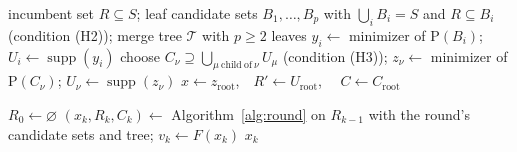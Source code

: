 \documentclass[pdflatex,sn-mathphys-num]{sn-jnl}
\theoremstyle{thmstyleone}
\theoremstyle{thmstyletwo}
\newcommand{\supp}{\operatorname{supp}}
\newcommand{\prob}[1]{\mathrm{P}(#1)}
\begin{document}
\begin{algorithm}[!ht]
\caption{One round of divide-and-conquer NNLS}\label{alg:round}
\begin{algorithmic}[1]
\Require incumbent set $R\subseteq S$; leaf candidate sets
$B_1,\dots,B_p$ with $\bigcup_i B_i=S$ and $R\subseteq B_i$
(condition (H2)); merge tree $\mathcal T$ with $p\ge2$ leaves
  \State $y_i\gets$ minimizer of $\prob{B_i}$;\quad
         $U_i\gets\supp(y_i)$
\EndFor
{}
  \State choose $C_\nu\supseteq\bigcup_{\mu\ \mathrm{child\ of}\
         \nu}U_\mu$ (condition (H3));\quad
         $z_\nu\gets$ minimizer of $\prob{C_\nu}$;\quad
         $U_\nu\gets\supp(z_\nu)$
\EndFor
\State\Return $x\gets z_{\mathrm{root}}$,\ \ $R'\gets U_{\mathrm{root}}$,
\ \ $C\gets C_{\mathrm{root}}$
\end{algorithmic}
\end{algorithm}

\begin{algorithm}[!ht]
\caption{Iterated divide-and-conquer NNLS}\label{alg:iter}
\begin{algorithmic}[1]
\State $R_0\gets\varnothing$
  \State $(x_k,R_k,C_k)\gets$ Algorithm~\ref{alg:round} on $R_{k-1}$
         with the round's candidate sets and tree;\quad
         $v_k\gets F(x_k)$
     \State\Return $x_k$ 
  \EndIf
\EndFor
\end{algorithmic}
\end{algorithm}
\end{document}
